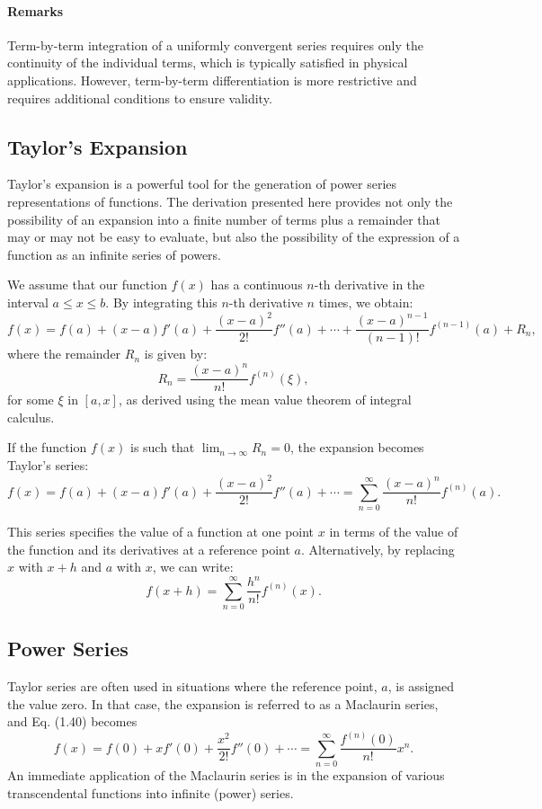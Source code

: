 \documentclass[12pt]{article}
\begin{document}
\paragraph{Remarks}
Term-by-term integration of a uniformly convergent series requires only the continuity of the individual terms, which is typically satisfied in physical applications. However, term-by-term differentiation is more restrictive and requires additional conditions to ensure validity.

\subsection{Taylor's Expansion}
Taylor's expansion is a powerful tool for the generation of power series representations of functions. The derivation presented here provides not only the possibility of an expansion into a finite number of terms plus a remainder that may or may not be easy to evaluate, but also the possibility of the expression of a function as an infinite series of powers.

We assume that our function \(f(x)\) has a continuous \(n\)-th derivative in the interval \(a \leq x \leq b\). By integrating this \(n\)-th derivative \(n\) times, we obtain:
\[
f(x) = f(a) + (x - a) f'(a) + \frac{(x - a)^2}{2!} f''(a) + \cdots + \frac{(x - a)^{n-1}}{(n-1)!} f^{(n-1)}(a) + R_n,
\]
where the remainder \(R_n\) is given by:
\[
R_n = \frac{(x - a)^n}{n!} f^{(n)}(\xi),
\]
for some \(\xi\) in \([a, x]\), as derived using the mean value theorem of integral calculus.

If the function \(f(x)\) is such that \(\lim_{n \to \infty} R_n = 0\), the expansion becomes Taylor's series:
\[
f(x) = f(a) + (x - a) f'(a) + \frac{(x - a)^2}{2!} f''(a) + \cdots = \sum_{n=0}^\infty \frac{(x - a)^n}{n!} f^{(n)}(a).
\]

This series specifies the value of a function at one point \(x\) in terms of the value of the function and its derivatives at a reference point \(a\). Alternatively, by replacing \(x\) with \(x + h\) and \(a\) with \(x\), we can write:
\[
f(x + h) = \sum_{n=0}^\infty \frac{h^n}{n!} f^{(n)}(x).
\]

\subsection{Power Series}
Taylor series are often used in situations where the reference point, \(a\), is assigned the value zero. In that case, the expansion is referred to as a Maclaurin series, and Eq. (1.40) becomes
\[
f(x) = f(0) + x f'(0) + \frac{x^2}{2!} f''(0) + \cdots = \sum_{n=0}^\infty \frac{f^{(n)}(0)}{n!} x^n.
\]
An immediate application of the Maclaurin series is in the expansion of various transcendental functions into infinite (power) series.
\end{document}
